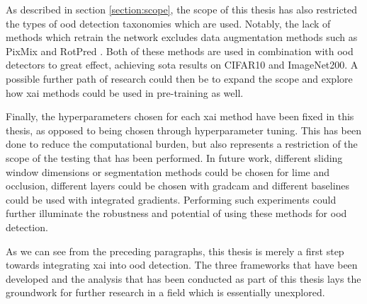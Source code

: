 \documentclass[UKenglish]{uiomasterthesis} %
\theoremstyle{definition}
\begin{document}
As described in section \ref{section:scope}, the scope of this thesis has also restricted the types of \ac{ood} detection taxonomies which are used. Notably, the lack of methods which retrain the network excludes data augmentation methods such as PixMix \cite{pixmix} and RotPred \cite{rotpred}. Both of these methods are used in combination with \ac{ood} detectors to great effect, achieving \ac{sota} results on CIFAR10 and ImageNet200. A possible further path of research could then be to expand the scope and explore how \ac{xai} methods could be used in pre-training as well.

Finally, the hyperparameters chosen for each \ac{xai} method have been fixed in this thesis, as opposed to being chosen through hyperparameter tuning. This has been done to reduce the computational burden, but also represents a restriction of the scope of the testing that has been performed. In future work, different sliding window dimensions or segmentation methods could be chosen for \ac{lime} and occlusion, different layers could be chosen with \ac{gradcam} and different baselines could be used with integrated gradients. Performing such experiments could further illuminate the robustness and potential of using these methods for \ac{ood} detection.

As we can see from the preceding paragraphs, this thesis is merely a first step towards integrating \ac{xai} into \ac{ood} detection. The three frameworks that have been developed and the analysis that has been conducted as part of this thesis lays the groundwork for further research in a field which is essentially unexplored.

\backmatter{}
\printbibliography{}
\end{document}
